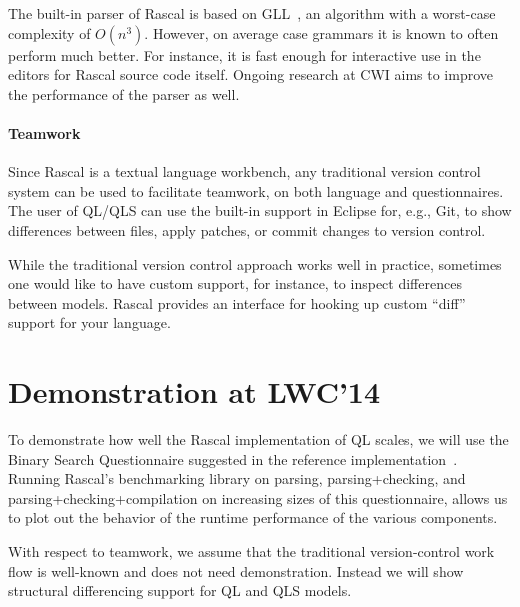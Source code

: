 \documentclass[a4paper]{article}
\begin{document}
The built-in parser of Rascal is based on GLL~\cite{GLLPTGEN}, an
algorithm with a worst-case complexity of $O(n^3)$. However, on
average case grammars it is known to often perform much better. For
instance, it is fast enough for interactive use in the editors for
Rascal source code itself. Ongoing research at CWI aims to improve the
performance of the parser as well.


\paragraph{Teamwork}
Since Rascal is a textual language workbench, any traditional version
control system can be used to facilitate teamwork, on both language and
questionnaires. The user of QL/QLS can use the built-in support in
Eclipse for, e.g., Git, to show differences between files, apply
patches, or commit changes to version control. 

While the traditional version control approach works well in practice,
sometimes one would like to have custom support, for instance, to
inspect differences between models. Rascal provides an interface for
hooking up custom ``diff'' support for your language. 


\section{Demonstration at LWC'14}

To demonstrate how well the Rascal implementation of QL scales, we
will use the Binary Search Questionnaire suggested in the reference
implementation~\cite{ReferenceImpl}. Running Rascal's benchmarking
library on parsing, parsing+checking, and parsing+checking+compilation
on increasing sizes of this questionnaire, allows us to plot out the
behavior of the runtime performance of the various components.

With respect to teamwork, we assume that the traditional
version-control work flow is well-known and does not need
demonstration. Instead we will show structural differencing support
for QL and QLS models.



\end{document}
